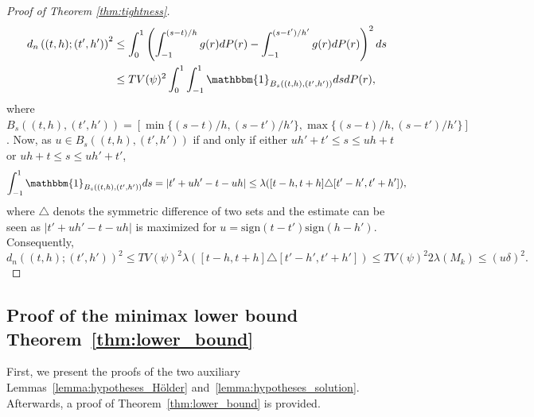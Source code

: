 \documentclass[10.5pt,letter]{article}
\numberwithin{equation}{section}
\theoremstyle{definition}
\newcommand{\1}{\mathbbm{1}}
\begin{document}
\begin{proof}[Proof of Theorem \ref{thm:tightness}]
    \begin{align*}
        d_n\left((t,h);(t',h')\right)^2 &\leq \int_0^1 \left(\int_{-1}^{(s-t)/h} g(r)dP(r)- \int_{-1}^{(s-t')/h'} g(r)dP(r)\right)^2 ds\\
        & \leq TV(\psi)^2 \int_0^1 \int_{-1}^1 \1_{B_s((t,h),(t',h'))} ds dP(r),
    \end{align*}
    where $B_s((t,h),(t',h'))=[\min\{(s-t)/h,(s-t')/h'\},\max\{(s-t)/h,(s-t')/h'\}]$.
    Now, as $u\in B_s((t,h),(t',h'))$ if and only if either $uh'+t'\leq s\leq uh+t$ or $uh+t\leq s\leq uh'+t'$, 
    \[ \int_{-1}^1 \1_{B_s((t,h),(t',h'))} ds =\left| t'+uh' - t - uh\right| \leq \lambda([t-h,t+h]\triangle[t'-h',t'+h']),\]
    where $\triangle $ denots the symmetric difference of two sets and the estimate can be seen as $| t'+uh' - t - uh|$ is maximized for $u=\mathrm{sign}(t-t')\mathrm{sign}(h-h')$. Consequently,
    \[ d_n\left((t,h);(t',h')\right)^2 \leq TV(\psi)^2  \lambda([t-h,t+h]\triangle[t'-h',t'+h']) \leq TV(\psi)^2 2 \lambda(M_k) \leq (u\delta)^2.\] 
\end{proof}












\subsection{Proof of the minimax lower bound Theorem~\ref{thm:lower_bound}}\label{Subsection:proof_lower_bound}
First, we present the proofs of the two auxiliary Lemmas~\ref{lemma:hypotheses_Hölder} and~\ref{lemma:hypotheses_solution}. Afterwards, a proof of Theorem~\ref{thm:lower_bound} is provided.
\end{document}
